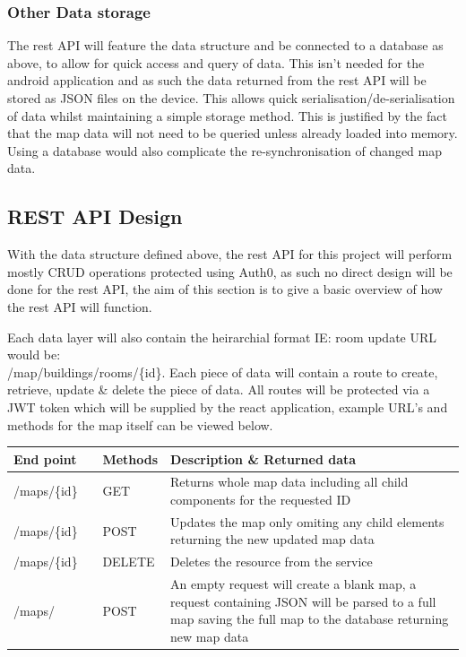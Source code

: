 \subsubsection{Other Data storage}
The rest API will feature the data structure and be connected to a database as above, to allow for quick access and query of data. This isn't needed for the android application and as such the data returned from the rest API will be stored as JSON files on the device. This allows quick serialisation/de-serialisation of data whilst maintaining a simple storage method. This is justified by the fact that the map data will not need to be queried unless already loaded into memory. Using a database would also complicate the re-synchronisation of changed map data.

\newpage
\subsection{REST API Design}
With the data structure defined above, the rest API for this project will perform mostly CRUD operations protected using Auth0, as such no direct design will be done for the rest API, the aim of this section is to give a basic overview of how the rest API will function.

Each data layer will also contain the heirarchial format IE: room update URL would be:\\ /map/buildings/rooms/\{id\}. Each piece of data will contain a route to create, retrieve, update \& delete the piece of data. All routes will be protected via a JWT token which will be supplied by the react application, example URL's and methods for the map itself can be viewed below.

\begin{longtable}{| p{0.2\linewidth} | p{0.1\linewidth} | p{0.7\linewidth}|}
	\hline
	End point & Methods & Description \& Returned data\\\hline
	/maps/\{id\} & GET & Returns whole map data including all child components for the requested ID\\\hline
	/maps/\{id\} & POST & Updates the map only omiting any child elements  returning the new updated map data\\\hline
	/maps/\{id\} & DELETE & Deletes the resource from the service\\\hline
	/maps/ & POST & An empty request will create a blank map, a request containing JSON will be parsed to a full map saving the full map to the database returning new map data\\\hline
	
\end{longtable}

